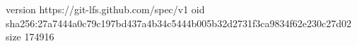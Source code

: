 version https://git-lfs.github.com/spec/v1
oid sha256:27a7444a0c79c197bd437a4b34c5444b005b32d2731f3ca9834f62e230c27d02
size 174916
